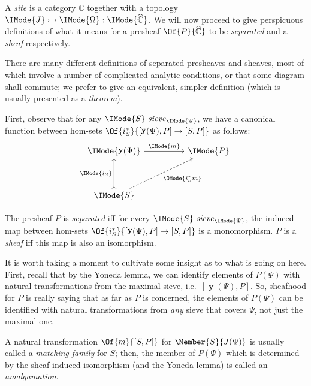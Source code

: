 \documentclass{article}
\DeclareMathOperator\OpYoneda{\mathbf{y}}
\newcommand\Yoneda[1]{\OpYoneda({#1})}
\newcommand\Psh[1]{\widehat{#1}}
\newcommand\IsSubobject[3]{\IMode{#1}\rightarrowtail\IMode{#2}:\IMode{#3}}
\newcommand\IsSieve[2]{\IMode{#2}\ \mathit{sieve}_{\IMode{#1}}}
\begin{document}
A \emph{site} is a category $\mathbb{C}$ together with a topology
$\IsSubobject{J}{\Omega}{\Psh{\mathbb{C}}}$. We will now
proceed to give perspicuous definitions of what it means for a
presheaf $\Of{P}{\Psh{\mathbb{C}}}$ to be \emph{separated} and a
\emph{sheaf} respectively.

There are many different definitions of separated presheaves and
sheaves, most of which involve a number of complicated analytic
conditions, or that some diagram shall commute; we prefer to give an
equivalent, simpler definition (which is usually presented as a
\emph{theorem}).

First, observe that for any $\IsSieve{\Psi}{S}$, we have a canonical
function between hom-sets
$\Of{i_S^*}{[\Yoneda{\Psi},P]\to [S,P]}$
as follows:
\[
  \begin{tikzcd}[sep=huge]
    \IMode{\Yoneda{\Psi}}
    \arrow[r, "\IMode{m}"]
    &
    \IMode{P}
    \\
    \IMode{S}
    \arrow[u,rightarrowtail,"\IMode{i_S}"]
    \arrow[ur,swap,dashed,"\OMode{i_S^*m}"]
  \end{tikzcd}
\]

\begin{definition}
  The presheaf $P$ is \emph{separated} iff for every
  $\IsSieve{\Psi}{S}$, the induced map between hom-sets
  $\Of{i_S^*}{[\Yoneda{\Psi},P]\to[S,P]}$ is a monomorphism. $P$ is a
  \emph{sheaf} iff this map is also an isomorphism.
\end{definition}

It is worth taking a moment to cultivate some insight as to what is
going on here. First, recall that by the Yoneda lemma, we can identify
elements of $P(\Psi)$ with natural transformations from the maximal
sieve, i.e.\ $[\Yoneda{\Psi},P]$. So, sheafhood for $P$ is really
saying that as far as $P$ is concerned, the elements of $P(\Psi)$ can
be identified with natural transformations from \emph{any} sieve that
covers $\Psi$, not just the maximal one.

\begin{definition}
  A natural transformation $\Of{m}{[S,P]}$ for $\Member{S}{J(\Psi)}$
  is usually called a \emph{matching family} for $S$; then, the member
  of $P(\Psi)$ which is determined by the sheaf-induced isomorphism
  (and the Yoneda lemma) is called an \emph{amalgamation}.
\end{definition}


\newcommand\Plus[1]{{#1}^+}
\newcommand\PlusPlus[1]{{#1}^{++}}
\end{document}
